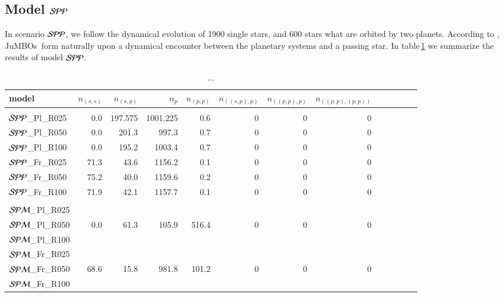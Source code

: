 \documentclass[aa]{lib/aa}
\newcommand{\jumbos}{\mbox{JuMBOs}}
\begin{document}
\subsection{Model ${\cal SPP}$}

In scenario ${\cal SPP}$, we follow the dynamical evolution of 1900
single stars, and 600 stars what are orbited by two planets.
According to \cite{2023arXiv231006016W}, \jumbos\, form naturally upon a
dynamical encounter between the planetary systems and a passing star.
In table\,\ref{Tab:model_PP} we summarize the results of model ${\cal
  SPP}$.

\begin{table}
 \caption{...}
 \label{Tab:model_PP}
 \centering 
 \begin{tabular}{lrrrrrrrrrrrr}
   \hline\hline
   model & $n_{(s,s)}$ & $n_{(s,p)}$ & $n_{p}$ & $n_{(p,p)}$ &  $n_{((s,p),p)}$ & $n_{((p,p),p)}$ & $n_{((p,p),(p,p))}$  \\
        \hline \vspace{-0.75em}\\
${\cal SPP}$\_Pl\_R025 & 0.0 & 197.575 & 1001.225 & 0.6 & 0 & 0 & 0 \\
${\cal SPP}$\_Pl\_R050 & 0.0 & 201.3 & 997.3 & 0.7 & 0 & 0 & 0 \\
${\cal SPP}$\_Pl\_R100 & 0.0 & 195.2 & 1003.4 & 0.7 & 0 & 0 & 0 \\
${\cal SPP}$\_Fr\_R025 & 71.3 & 43.6 & 1156.2 & 0.1 & 0 & 0 & 0 \\
${\cal SPP}$\_Fr\_R050 & 75.2 & 40.0 & 1159.6 & 0.2 & 0 & 0 & 0 \\
${\cal SPP}$\_Fr\_R100 & 71.9 & 42.1 & 1157.7 & 0.1 & 0 & 0 & 0 \\
 \hline
  \hline \vspace{-0.75em}\\
${\cal SPM}$\_Pl\_R025& \\
${\cal SPM}$\_Pl\_R050 & 0.0 & 61.3 & 105.9 & 516.4 & 0 & 0 & 0 \\
${\cal SPM}$\_Pl\_R100 & \\
${\cal SPM}$\_Fr\_R025 &\\
${\cal SPM}$\_Fr\_R050 & 68.6 & 15.8 & 981.8 & 101.2 & 0 & 0 & 0 \\
${\cal SPM}$\_Fr\_R100 &     \\
  \hline
 \end{tabular}
\end{table}
\end{document}

